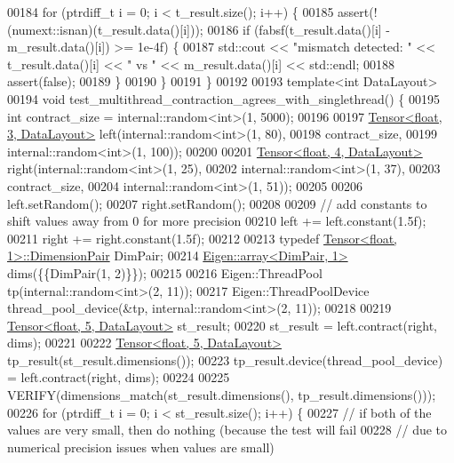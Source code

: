 \begin{DoxyCode}
00184   \textcolor{keywordflow}{for} (ptrdiff\_t i = 0; i < t\_result.size(); i++) \{
00185     assert(!(numext::isnan)(t\_result.data()[i]));
00186     \textcolor{keywordflow}{if} (fabsf(t\_result.data()[i] - m\_result.data()[i]) >= 1e-4f) \{
00187       std::cout << \textcolor{stringliteral}{"mismatch detected: "} << t\_result.data()[i] << \textcolor{stringliteral}{" vs "} <<  m\_result.data()[i] << 
      std::endl;
00188       assert(\textcolor{keyword}{false});
00189     \}
00190   \}
00191 \}
00192 
00193 \textcolor{keyword}{template}<\textcolor{keywordtype}{int} DataLayout>
00194 \textcolor{keywordtype}{void} test\_multithread\_contraction\_agrees\_with\_singlethread() \{
00195   \textcolor{keywordtype}{int} contract\_size = internal::random<int>(1, 5000);
00196 
00197   \hyperlink{class_eigen_1_1_tensor}{Tensor<float, 3, DataLayout>} left(internal::random<int>(1, 80),
00198                                     contract\_size,
00199                                     internal::random<int>(1, 100));
00200 
00201   \hyperlink{class_eigen_1_1_tensor}{Tensor<float, 4, DataLayout>} right(internal::random<int>(1, 25),
00202                                      internal::random<int>(1, 37),
00203                                      contract\_size,
00204                                      internal::random<int>(1, 51));
00205 
00206   left.setRandom();
00207   right.setRandom();
00208 
00209   \textcolor{comment}{// add constants to shift values away from 0 for more precision}
00210   left += left.constant(1.5f);
00211   right += right.constant(1.5f);
00212 
00213   \textcolor{keyword}{typedef} \hyperlink{class_eigen_1_1_tensor}{Tensor<float, 1>::DimensionPair} DimPair;
00214   \hyperlink{class_eigen_1_1array}{Eigen::array<DimPair, 1>} dims(\{\{DimPair(1, 2)\}\});
00215 
00216   Eigen::ThreadPool tp(internal::random<int>(2, 11));
00217   Eigen::ThreadPoolDevice thread\_pool\_device(&tp, internal::random<int>(2, 11));
00218 
00219   \hyperlink{class_eigen_1_1_tensor}{Tensor<float, 5, DataLayout>} st\_result;
00220   st\_result = left.contract(right, dims);
00221 
00222   \hyperlink{class_eigen_1_1_tensor}{Tensor<float, 5, DataLayout>} tp\_result(st\_result.dimensions());
00223   tp\_result.device(thread\_pool\_device) = left.contract(right, dims);
00224 
00225   VERIFY(dimensions\_match(st\_result.dimensions(), tp\_result.dimensions()));
00226   \textcolor{keywordflow}{for} (ptrdiff\_t i = 0; i < st\_result.size(); i++) \{
00227     \textcolor{comment}{// if both of the values are very small, then do nothing (because the test will fail}
00228     \textcolor{comment}{// due to numerical precision issues when values are small)}

\end{DoxyCode}
